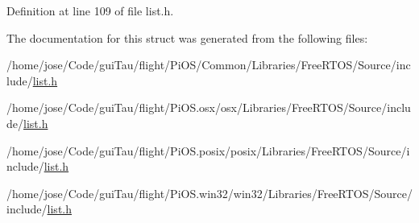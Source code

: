 Definition at line 109 of file list.\-h.



The documentation for this struct was generated from the following files\-:\begin{DoxyCompactItemize}
\item 
/home/jose/\-Code/gui\-Tau/flight/\-Pi\-O\-S/\-Common/\-Libraries/\-Free\-R\-T\-O\-S/\-Source/include/\hyperlink{_common_2_libraries_2_free_r_t_o_s_2_source_2include_2list_8h}{list.\-h}\item 
/home/jose/\-Code/gui\-Tau/flight/\-Pi\-O\-S.\-osx/osx/\-Libraries/\-Free\-R\-T\-O\-S/\-Source/include/\hyperlink{osx_2osx_2_libraries_2_free_r_t_o_s_2_source_2include_2list_8h}{list.\-h}\item 
/home/jose/\-Code/gui\-Tau/flight/\-Pi\-O\-S.\-posix/posix/\-Libraries/\-Free\-R\-T\-O\-S/\-Source/include/\hyperlink{posix_2posix_2_libraries_2_free_r_t_o_s_2_source_2include_2list_8h}{list.\-h}\item 
/home/jose/\-Code/gui\-Tau/flight/\-Pi\-O\-S.\-win32/win32/\-Libraries/\-Free\-R\-T\-O\-S/\-Source/include/\hyperlink{win32_2win32_2_libraries_2_free_r_t_o_s_2_source_2include_2list_8h}{list.\-h}\end{DoxyCompactItemize}
